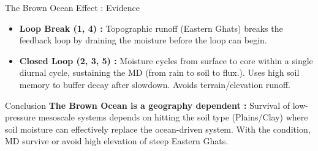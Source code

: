 \documentclass[8pt, aspectratio=169]{beamer}
\begin{document}
\begin{frame}{The Brown Ocean Effect : Evidence}
    \footnotesize
    \begin{itemize}
        \item \textbf{Loop Break (1, 4) :} Topographic runoff (Eastern Ghats) breaks the feedback loop by draining the moisture before the loop can begin. \cite{clapp1978empirical}
        \item \textbf{Closed Loop (2, 3, 5) :} Moisture cycles from surface to core within a single diurnal cycle, sustaining the MD (from rain to soil to flux.). Uses high soil memory to buffer decay after slowdown. Avoids terrain/elevation runoff.
    \end{itemize}

    \begin{block}{Conclusion}
        \footnotesize
        \textbf{The Brown Ocean is a geography dependent :} Survival of low-pressure mesoscale systems depends on hitting the soil type (Plains/Clay) where soil moisture can effectively replace the ocean-driven system. With the condition, MD survive or avoid high elevation of steep Eastern Ghats.
    \end{block}
\end{frame}
\end{document}
